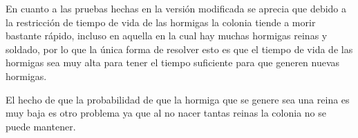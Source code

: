 En cuanto a las pruebas hechas en la versión modificada se aprecia que debido a la restricción de tiempo de vida de las hormigas la colonia tiende a morir bastante rápido, incluso en aquella en la cual hay muchas hormigas reinas y soldado, por lo que la única forma de resolver esto es que el tiempo de vida de las hormigas sea muy alta para tener el tiempo suficiente para que generen nuevas hormigas. 

El hecho de que la probabilidad de que la hormiga que se genere sea una reina es muy baja es otro problema ya que al no nacer tantas reinas la colonia no se puede mantener.
